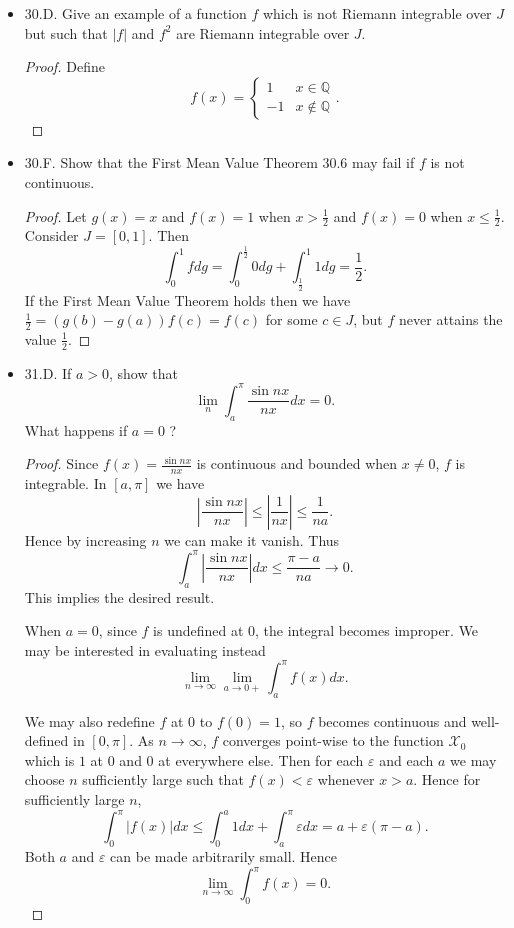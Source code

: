 \begin{itemize}
\item 30.D. Give an example of a function $f$ which is not Riemann integrable over $J$ but such that $|f|$ and $f^2$ are Riemann integrable over $J$.
\begin{proof}
	Define
	\[
		f(x) = \begin{cases}
			1 & x \in \mathbb{Q}\\
			-1 & x \not\in \mathbb{Q}
		\end{cases} 
	.\] 
\end{proof}


\item 30.F. Show that the First Mean Value Theorem $30.6$ may fail if $f$ is not continuous.
\begin{proof}
	Let $g(x) = x$ and $f(x) = 1$ when $x > \frac{1}{2}$ and $f(x) = 0$ when $x\le \frac{1}{2}$. Consider $J = [0,1]$. Then
	\[
		\int _0^1 f dg = \int_0^{\frac{1}{2}} 0 dg + \int _{\frac{1}{2}}^1 1 dg = \frac{1}{2}
	.\] 
	If the First Mean Value Theorem holds then we have $\frac{1}{2} = \left(g(b) - g(a)\right) f(c) = f(c)$ for some $c \in J$, but $f$ never attains the value $\frac{1}{2}$.
\end{proof}


\item 31.D. If $a>0$, show that
\[
\lim _n \int_a^\pi \frac{\sin n x}{n x} d x=0 .
\]
What happens if $a=0$ ?
\begin{proof}
	Since $f(x) = \frac{\sin n x}{n x}$ is continuous and bounded when $x \neq 0$, $f$ is integrable.
	In $[a, \pi]$ we have
	\[
		|\frac{\sin nx}{nx}| \le  |\frac{1}{n x}|
		\le  \frac{1}{n a}
	.\] 
	Hence by increasing $n$ we can make it vanish. Thus
	\[
		\int_a^\pi \left| \frac{\sin nx}{nx} \right| dx \le \frac{\pi - a}{n a} \to  0
	.\] 
	This implies the desired result.

	When $a = 0$, since $f$ is undefined at $0$, the integral becomes improper. We may be interested in evaluating instead
	\[
		\lim_{n \to \infty} \lim_{a \to 0+} \int _a^\pi f(x) dx
	.\] 

	We may also redefine $f$ at $0$ to $f(0) = 1$, so $f$ becomes continuous and well-defined in $[0, \pi]$. As $n\to \infty $, $f$ converges point-wise to the function $\mathcal{X}_0$ which is $1$ at $0$ and $0$ at everywhere else. Then for each $\varepsilon$ and each $a$ we may choose $n$ sufficiently large such that $f(x) < \varepsilon$ whenever $x > a$. Hence for sufficiently large $n$,
	\[
		\int_0^\pi |f(x)| dx \le  \int_0^a 1 dx + \int _a^\pi \varepsilon dx = a + \varepsilon(\pi - a)
	.\] 
	Both $a$ and $\varepsilon$ can be made arbitrarily small. Hence
	 \[
		\lim_{n \to \infty} \int_0^\pi f(x) = 0
	.\] 
\end{proof}



\end{itemize}
